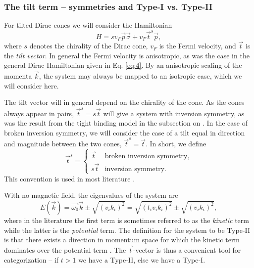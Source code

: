 
\subsubsection{The tilt term -- symmetries and Type-I vs.\! Type-II}
For tilted Dirac cones we will consider the Hamiltonian
\begin{equation}
  \label{eq:10}
  H =  s v_F \vec{p} \vec{\sigma} + v_F \vec{t}^s \vec{p},
\end{equation}
where \( s \) denotes the chirality of the Dirac cone, \( v_F \) is the Fermi velocity, and \( \vec{t} \) is the \emph{tilt vector}.
In general the Fermi velocity is anisotropic, as was the case in the general Dirac Hamiltonian given in Eq. \eqref{eq:4}.
By an anisotropic scaling of the momenta \( \vec{k} \), the system may always be mapped to an isotropic case, which we will consider here.

The tilt vector will in general depend on the chirality of the cone.
As the cones always appear in pairs, \( \vec{t}^s = s \vec{t} \) will give a system with inversion symmetry, as was the result from the tight binding model in the subsection on \emph{}.
In the case of broken inversion symmetry, we will consider the case of a tilt equal in direction and magnitude between the two cones, \( \vec{t}^s = \vec{t} \).
In short, we define
\begin{equation}
  \vec{t}^s =
  \begin{cases}
    \vec{t} & \text{broken inversion symmetry},\\
    s \vec{t} & \text{inversion symmetry}.
  \end{cases}\label{eq:11}
\end{equation}
This convention is used in most literature \cite{vanderwurffMagnetovorticalThermoelectricTransport2019,ferreirosAnomalousNernstThermal2017}.

With no magnetic field, the eigenvalues of the system are
\begin{equation}
  \label{eq:12}
  E(\vec{k}) = \vec{\omega_{0}} \vec{k} \pm \sqrt{(v_{i} k_{i})^{2}} = \sqrt{(t_{i} v_{i} k_{i})^{2}} \pm \sqrt{(v_{i} k_{i})^{2}},
\end{equation}
where in the literature the first term is sometimes referred to as the \emph{kinetic} term while the latter is the \emph{potential} term.
The definition for the system to be Type-II is that there exists a direction in momentum space for which the kinetic term dominates over the potential term \cite{soluyanovTypeIIWeylSemimetals2015}.
The \(\vec{t}\)-vector is thus a convenient tool for categorization -- if \(t > 1\) we have a Type-II, else we have a Type-I.


